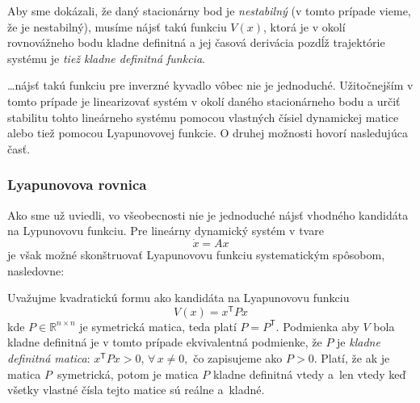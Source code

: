 \documentclass[a4paper, 10pt, ]{article}
\begin{document}
Aby sme dokázali, že daný stacionárny bod je \emph{nestabilný} (v tomto prípade vieme, že je nestabilný), musíme nájsť takú funkciu $V(x)$, ktorá je v okolí rovnovážneho bodu kladne definitná a jej časová derivácia pozdĺž trajektórie systému je \emph{tiež kladne definitná funkcia}.

\noindent
\ldots nájsť takú funkciu pre inverzné kyvadlo vôbec nie je jednoduché. Užitočnejším v tomto prípade je linearizovať systém v okolí daného stacionárneho bodu a určiť stabilitu tohto lineárneho systému pomocou vlastných čísiel dynamickej matice alebo tiež pomocou Lyapunovovej funkcie. O druhej možnosti hovorí nasledujúca časť.



\subsubsection{Lyapunovova rovnica}

Ako sme už uviedli, vo všeobecnosti nie je jednoduché nájsť vhodného kandidáta na Lypunovovu funkciu.
Pre lineárny dynamický systém v tvare
\begin{equation}
	\dot{x} = Ax
\end{equation}
je však možné skonštruovať Lyapunovovu funkciu systematickým spôsobom, nasledovne:

\noindent
Uvažujme kvadratickú formu ako kandidáta na Lyapunovovu funkciu
\begin{equation}
	V(x) = x^\mathsf{T}Px
\end{equation}
kde $P \in \mathbb{R}^{n \times n}$ je symetrická matica, teda platí  $P = P^\mathsf{T}$. Podmienka aby $V$ bola kladne definitná je v tomto prípade ekvivalentná podmienke, že $P$ je \emph{kladne definitná matica}:
$
 x^\mathsf{T}Px > 0, \, \forall \, x \neq 0,
$
čo zapisujeme ako $P > 0$. Platí, že ak je matica $P$~symetrická, potom je matica $P$ kladne definitná vtedy a~len vtedy keď všetky vlastné čísla tejto matice sú reálne a~kladné.
\end{document}
